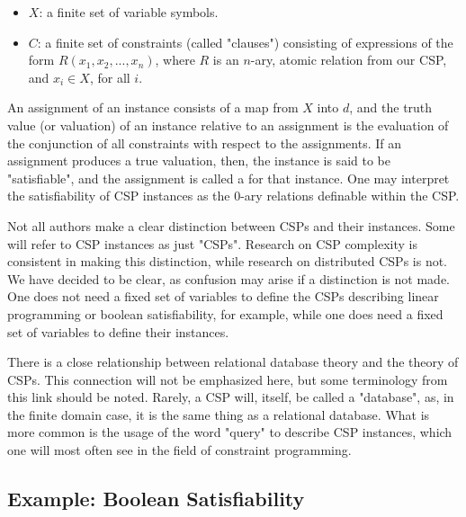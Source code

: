 \begin{itemize}
  \item $X$: a finite set of variable symbols.
  \item $C$: a finite set of constraints (called "clauses") consisting of expressions of the form $R(x_1,x_2,...,x_n)$, where $R$ is an $n$-ary, atomic relation from our CSP, and $x_i \in X$, for all $i$.
\end{itemize}

An assignment of an instance consists of a map from $X$ into $d$, and the truth value (or valuation) of an instance relative to an assignment is the evaluation of the conjunction of all constraints with respect to the assignments. If an assignment produces a true valuation, then, the instance is said to be "satisfiable", and the assignment is called a  for that instance. One may interpret the satisfiability of CSP instances as the 0-ary relations definable within the CSP.

\begin{remark}\label{remark:instance-terminology}
Not all authors make a clear distinction between CSPs and their instances. Some will refer to CSP instances as just "CSPs". Research on CSP complexity is consistent in making this distinction, while research on distributed CSPs is not. We have decided to be clear, as confusion may arise if a distinction is not made. One does not need a fixed set of variables to define the CSPs describing linear programming or boolean satisfiability, for example, while one does need a fixed set of variables to define their instances.
\end{remark}

\begin{remark}\label{remark:relational-database-terminology}
There is a close relationship between relational database theory and the theory of CSPs. This connection will not be emphasized here, but some terminology from this link should be noted. Rarely, a CSP will, itself, be called a "database", as, in the finite domain case, it is the same thing as a relational database. What is more common is the usage of the word "query" to describe CSP instances, which one will most often see in the field of constraint programming.
\end{remark}

\subsection{Example: Boolean Satisfiability}\label{sec:two-sat}

